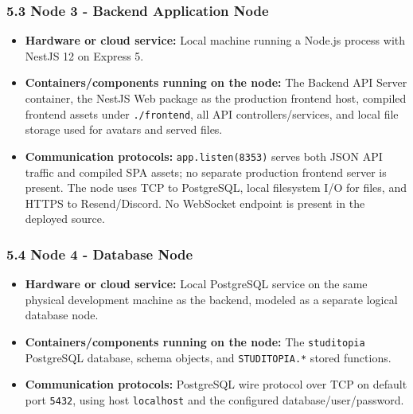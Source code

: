 \documentclass[12pt]{article}
\begin{document}
\hypertarget{sec:5-3-node-3-backend-application-node}{}
\subsubsection*{5.3 Node 3 - Backend Application Node}
\par\medskip

\begin{itemize}
\item \textbf{Hardware or cloud service:} Local machine running a Node.js process with NestJS 12 on Express 5.
\item \textbf{Containers/components running on the node:} The Backend API Server container, the NestJS Web package as the production frontend host, compiled frontend assets under \texttt{./frontend}, all API controllers/services, and local file storage used for avatars and served files.
\item \textbf{Communication protocols:} \texttt{app.listen(8353)} serves both JSON API traffic and compiled SPA assets; no separate production frontend server is present. The node uses TCP to PostgreSQL, local filesystem I/O for files, and HTTPS to Resend/Discord. No WebSocket endpoint is present in the deployed source.
\end{itemize}
\par\medskip

\hypertarget{sec:5-4-node-4-database-node}{}
\subsubsection*{5.4 Node 4 - Database Node}
\par\medskip

\begin{itemize}
\item \textbf{Hardware or cloud service:} Local PostgreSQL service on the same physical development machine as the backend, modeled as a separate logical database node.
\item \textbf{Containers/components running on the node:} The \texttt{studitopia} PostgreSQL database, schema objects, and \texttt{STUDITOPIA.*} stored functions.
\item \textbf{Communication protocols:} PostgreSQL wire protocol over TCP on default port \texttt{5432}, using host \texttt{localhost} and the configured database/user/password.
\end{itemize}
\par\medskip
\end{document}
